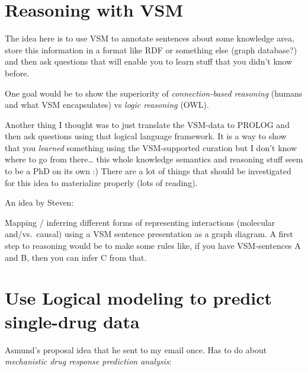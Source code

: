 \documentclass[12pt,]{book}
\begin{document}
\hypertarget{reasoning-with-vsm}{%
\section{Reasoning with VSM}\label{reasoning-with-vsm}}

The idea here is to use VSM to annotate sentences about some knowledge area,
store this information in a format like RDF or something else (graph database?)
and then ask questions that will enable you to learn stuff that you didn't know
before.

One goal would be to show the superiority of \emph{connection-based reasoning}
(humans and what VSM encapsulates) vs \emph{logic reasoning} (OWL).

Another thing I thought was to just translate the VSM-data to PROLOG
and then ask questions using that logical language framework. It is a way to show
that you \emph{learned} something using the VSM-supported curation but I don't know
where to go from there\ldots{} this whole knowledge semantics and reasoning stuff
seem to be a PhD on its own :) There are a lot of things that should
be investigated for this idea to materialize properly (lots of reading).

An idea by Steven:

Mapping / inferring different forms of representing interactions (molecular
and/vs.~causal) using a VSM sentence presentation as a graph diagram. A first
step to reasoning would be to make some rules like, if you have VSM-sentences
A and B, then you can infer C from that.

\hypertarget{use-logical-modeling-to-predict-single-drug-data}{%
\section{Use Logical modeling to predict single-drug data}\label{use-logical-modeling-to-predict-single-drug-data}}

Asmund's proposal idea that he sent to my email once. Has to do about \emph{mechanistic drug response prediction analysis}:
\end{document}
